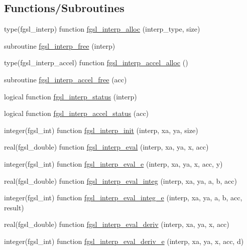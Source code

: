 \subsection*{Functions/\-Subroutines}
\begin{DoxyCompactItemize}
\item 
type(fgsl\-\_\-interp) function \hyperlink{interp_8finc_a85d81be60660a84879e2148724d250cc}{fgsl\-\_\-interp\-\_\-alloc} (interp\-\_\-type, size)
\item 
subroutine \hyperlink{interp_8finc_a3cec445cbc603ff9045fc6eb5b2aee36}{fgsl\-\_\-interp\-\_\-free} (interp)
\item 
type(fgsl\-\_\-interp\-\_\-accel) function \hyperlink{interp_8finc_a8ef030df058aadca9f34d486136f1a2a}{fgsl\-\_\-interp\-\_\-accel\-\_\-alloc} ()
\item 
subroutine \hyperlink{interp_8finc_a943a42ee8c354909f417bdd5d3e51425}{fgsl\-\_\-interp\-\_\-accel\-\_\-free} (acc)
\item 
logical function \hyperlink{interp_8finc_ae7b75708ca1cabe167d868cd155713d4}{fgsl\-\_\-interp\-\_\-status} (interp)
\item 
logical function \hyperlink{interp_8finc_ae1478c665d9d001580eb90c855b6288d}{fgsl\-\_\-interp\-\_\-accel\-\_\-status} (acc)
\item 
integer(fgsl\-\_\-int) function \hyperlink{interp_8finc_a54c00b2741881cf6689a3799ad490456}{fgsl\-\_\-interp\-\_\-init} (interp, xa, ya, size)
\item 
real(fgsl\-\_\-double) function \hyperlink{interp_8finc_a95909e5a34b271d917d35fdb5f1168f0}{fgsl\-\_\-interp\-\_\-eval} (interp, xa, ya, x, acc)
\item 
integer(fgsl\-\_\-int) function \hyperlink{interp_8finc_a1439d29134b2c5dbaa2b091f925c3dca}{fgsl\-\_\-interp\-\_\-eval\-\_\-e} (interp, xa, ya, x, acc, y)
\item 
real(fgsl\-\_\-double) function \hyperlink{interp_8finc_a51d1986524d01be2a3f9e24ddaccadf5}{fgsl\-\_\-interp\-\_\-eval\-\_\-integ} (interp, xa, ya, a, b, acc)
\item 
integer(fgsl\-\_\-int) function \hyperlink{interp_8finc_a1aa6af97dc477f8439664601e8aa231a}{fgsl\-\_\-interp\-\_\-eval\-\_\-integ\-\_\-e} (interp, xa, ya, a, b, acc, result)
\item 
real(fgsl\-\_\-double) function \hyperlink{interp_8finc_ac57b89652d8434b0ed0c0757e1b408a3}{fgsl\-\_\-interp\-\_\-eval\-\_\-deriv} (interp, xa, ya, x, acc)
\item 
integer(fgsl\-\_\-int) function \hyperlink{interp_8finc_ab255bde1c108629a83829561e5f1b3db}{fgsl\-\_\-interp\-\_\-eval\-\_\-deriv\-\_\-e} (interp, xa, ya, x, acc, d)

\end{DoxyCompactItemize}
